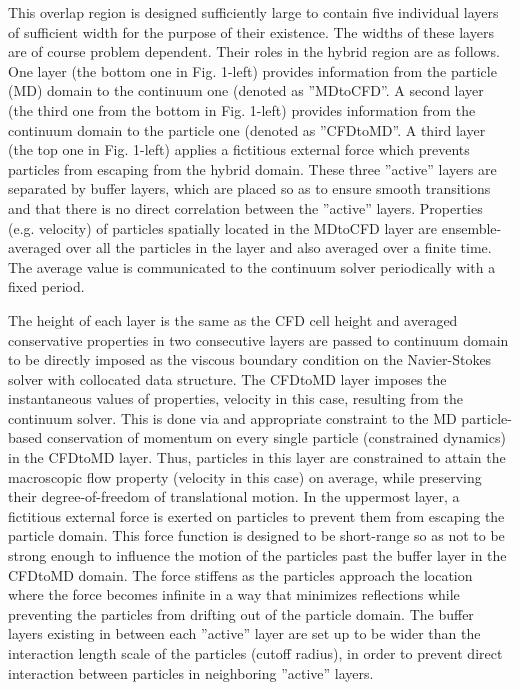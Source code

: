 \documentclass[preprint,12pt]{elsarticle}
\begin{document}
This overlap region is designed sufficiently large to contain five individual layers of sufficient width for the purpose of their existence. The widths of these layers are of course problem dependent. Their roles in the hybrid region are as follows. One layer (the bottom one in Fig. 1-left) provides information from the particle (MD) domain to the continuum one (denoted as ''MDtoCFD''. A second layer (the third one from the bottom in Fig. 1-left) provides information from the continuum domain to the particle one (denoted as ''CFDtoMD''. A third layer (the top one in Fig. 1-left) applies a fictitious external force which prevents particles from escaping from the hybrid domain. These three ''active'' layers are separated by buffer layers, which are placed so as to ensure smooth transitions and that there is no direct correlation between the ''active'' layers. Properties (e.g. velocity) of particles spatially located in the MDtoCFD layer are ensemble-averaged over all the particles in the layer and also averaged over a finite time. The average value is communicated to the continuum solver periodically with a fixed period.

The height of each layer is the same as the CFD cell height and averaged conservative properties in two consecutive layers are passed to continuum domain to be directly imposed as the viscous boundary condition on the Navier-Stokes solver with collocated data structure. The CFDtoMD layer imposes the instantaneous values of properties, velocity in this case, resulting from the continuum solver. This is done via and appropriate constraint to the MD particle-based conservation of momentum on every single particle (constrained dynamics) in the CFDtoMD layer. Thus, particles in this layer are constrained to attain the macroscopic flow property (velocity in this case) on average, while preserving their degree-of-freedom of translational motion. In the uppermost layer, a fictitious external force is exerted on particles to prevent them from escaping the particle domain. This force function is designed to be short-range so as not to be strong enough to influence the motion of the particles past the buffer layer in the CFDtoMD domain. The force stiffens as the particles approach the location where the force becomes infinite in a way that minimizes reflections while preventing the particles from drifting out of the particle domain. The buffer layers existing in between each ''active'' layer are set up to be wider than the interaction length scale of the particles (cutoff radius), in order to prevent direct interaction between particles in neighboring ''active'' layers.
\end{document}
